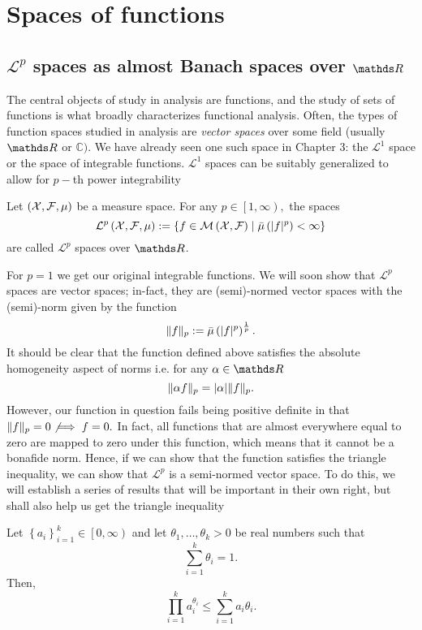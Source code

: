 
\chapter{Spaces of functions\label{chap:spaces_of_functions}}

\section{$\mathcal{L}^{p}$ spaces as almost Banach spaces over $\protect\R$}

The central objects of study in analysis are functions, and the study
of sets of functions is what broadly characterizes functional analysis.
Often, the types of function spaces studied in analysis are \emph{vector
spaces }over some field (usually $\R$ or $\mathds{C})$. We have
already seen one such space in Chapter 3: the $\mathcal{L}^{1}$ space
or the space of integrable functions. $\mathcal{L}^{1}$ spaces can
be suitably generalized to allow for $p-$th power integrability
\begin{defn}
\label{def:LpSpace}Let $\left(\mathcal{X},\mathcal{F},\mu\right)$ be a measure space.
For any $p\in\left[1,\infty\right),$ the spaces 
\[
\mathcal{L}^{p}\left(\mathcal{X},\mathcal{F},\mu\right):=\left\{ f\in\mathcal{M}\left(\mathcal{X},\mathcal{F}\right)\mid\bar{\mu}\left(\lvert f\rvert^{p}\right)<\infty\right\} 
\]
are called $\mathcal{L}^{p}$ spaces over $\R$.
\end{defn}

For $p=1$ we get our original integrable functions. We will soon
show that $\mathcal{L}^{p}$ spaces are vector spaces; in-fact, they
are (semi)-normed vector spaces with the (semi)-norm given by the
function
\[
\lVert f\rVert_{p}:=\bar{\mu}\left(\lvert f\rvert^{p}\right)^{\frac{1}{p}}.
\]
It should be clear that the function defined above satisfies the absolute
homogeneity aspect of norms i.e. for any $\alpha\in\R$ 
\[
\lVert\alpha f\rVert_{p}=\lvert\alpha\rvert\lVert f\rVert_{p}.
\]
However, our function in question fails being positive definite in
that $\lVert f\rVert_{p}=0\not\implies f=0.$ In fact, all functions that are
almost everywhere equal to zero are mapped to zero under this function,
which means that it cannot be a bonafide norm. Hence, if we can show
that the function satisfies the triangle inequality, we can show that
$\mathcal{L}^{p}$ is a semi-normed vector space. To do this, we will
establish a series of results that will be important in their own
right, but shall also help us get the triangle inequality
\begin{lem}
\label{lem:amGmInequality}Let $\left\{ a_{i}\right\} _{i=1}^{k}\in\left[0,\infty\right)$
and let $\theta_{1},\ldots,\theta_{k}>0$ be real numbers such that
\[
\sum_{i=1}^{k}\theta_{i}=1.
\]
Then,
\[
\prod_{i=1}^{k}a_{i}^{\theta_{i}}\leq\sum_{i=1}^{k}a_{i}\theta_{i}.
\]
\end{lem}

